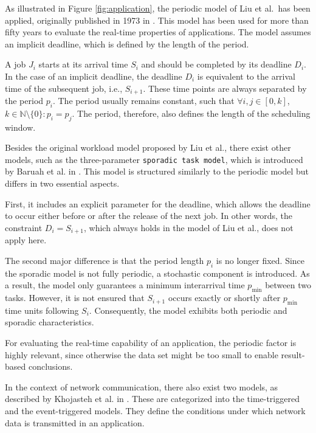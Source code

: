 As illustrated in Figure \ref{fig:application}, the periodic model of Liu et al.\ has been applied, originally published in 1973 in \cite{10.1145/321738.321743}.  
This model has been used for more than fifty years to evaluate the real-time properties of applications.  
The model assumes an implicit deadline, which is defined by the length of the period.  

A job $J_i$ starts at its arrival time $S_i$ and should be completed by its deadline $D_i$.  
In the case of an implicit deadline, the deadline $D_i$ is equivalent to the arrival time of the subsequent job, i.e., $S_{i+1}$.  
These time points are always separated by the period $p_i$.  
The period usually remains constant, such that $\forall i,j \in [0, k]$, $k \in \mathbb{N}\setminus \{0\}: p_i = p_j$.  
The period, therefore, also defines the length of the scheduling window.  

Besides the original workload model proposed by Liu et al., there exist other models, such as the three-parameter \texttt{sporadic task model}, which is introduced by Baruah et al. in \cite[p.~15, 16]{Baruah2015}.  
This model is structured similarly to the periodic model but differs in two essential aspects.  

First, it includes an explicit parameter for the deadline, which allows the deadline to occur either before or after the release of the next job.  
In other words, the constraint $D_i = S_{i+1}$, which always holds in the model of Liu et al., does not apply here.  

The second major difference is that the period length $p_i$ is no longer fixed.  
Since the sporadic model is not fully periodic, a stochastic component is introduced.  
As a result, the model only guarantees a minimum interarrival time $p_{\min}$ between two tasks.  
However, it is not ensured that $S_{i+1}$ occurs exactly or shortly after $p_{\min}$ time units following $S_i$.  
Consequently, the model exhibits both periodic and sporadic characteristics.  

For evaluating the real-time capability of an application, the periodic factor is highly relevant, since otherwise the data set might be too small to enable result-based conclusions.  

In the context of network communication, there also exist two models, as described by Khojasteh et al. in \cite{khojasteh2017timetriggeringversuseventtriggeringcontrol}.  
These are categorized into the time-triggered and the event-triggered models.  
They define the conditions under which network data is transmitted in an application.  

